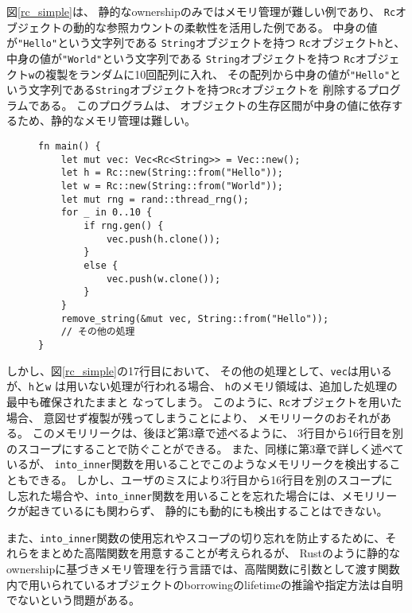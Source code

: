 \documentclass{sumiilab-paper}
\theoremstyle{mystyle}
\numberwithin{definition}{chapter} %
\begin{document}
図\ref{rc_simple}は、
静的なownershipのみではメモリ管理が難しい例であり、
\texttt{Rc}オブジェクトの動的な参照カウントの柔軟性を活用した例である。
中身の値が\texttt{"Hello"}という文字列である
\texttt{String}オブジェクトを持つ
\texttt{Rc}オブジェクト\texttt{h}と、
中身の値が\texttt{"World"}という文字列である
\texttt{String}オブジェクトを持つ
\texttt{Rc}オブジェクト\texttt{w}の複製をランダムに10回配列に入れ、
その配列から中身の値が\texttt{"Hello"}という文字列である\texttt{String}オブジェクトを持つ\texttt{Rc}オブジェクトを
削除するプログラムである。
このプログラムは、
オブジェクトの生存区間が中身の値に依存するため、静的なメモリ管理は難しい。
\begin{figure}[htp]
\begin{lstlisting}[caption=静的なメモリ管理では柔軟性に欠ける例, label=rc_simple, captionpos=b]
fn main() {
    let mut vec: Vec<Rc<String>> = Vec::new();
    let h = Rc::new(String::from("Hello"));
    let w = Rc::new(String::from("World"));
    let mut rng = rand::thread_rng();
    for _ in 0..10 {
        if rng.gen() {
            vec.push(h.clone());
        }
        else {
            vec.push(w.clone());
        }
    }
    remove_string(&mut vec, String::from("Hello"));
    // その他の処理
}
\end{lstlisting}
\end{figure}

しかし、図\ref{rc_simple}の17行目において、
その他の処理として、\texttt{vec}は用いるが、\texttt{h}と\texttt{w}
は用いない処理が行われる場合、
\texttt{h}のメモリ領域は、追加した処理の最中も確保されたままと
なってしまう。
このように、\texttt{Rc}オブジェクトを用いた場合、
意図せず複製が残ってしまうことにより、
メモリリークのおそれがある。
このメモリリークは、後ほど第3章で述べるように、
3行目から16行目を別のスコープにすることで防ぐことができる。
また、同様に第3章で詳しく述べているが、
\texttt{into\_inner}関数を用いることでこのようなメモリリークを検出することもできる。
しかし、ユーザのミスにより3行目から16行目を別のスコープに
し忘れた場合や、\texttt{into\_inner}関数を用いることを忘れた場合には、メモリリークが起きているにも関わらず、
静的にも動的にも検出することはできない。

また、\texttt{into\_inner}関数の使用忘れやスコープの切り忘れを防止するために、それらをまとめた高階関数を用意することが考えられるが、
Rustのように静的なownershipに基づきメモリ管理を行う言語では、高階関数に引数として渡す関数内で用いられているオブジェクトのborrowingのlifetimeの推論や指定方法は自明でないという問題がある。
\end{document}
